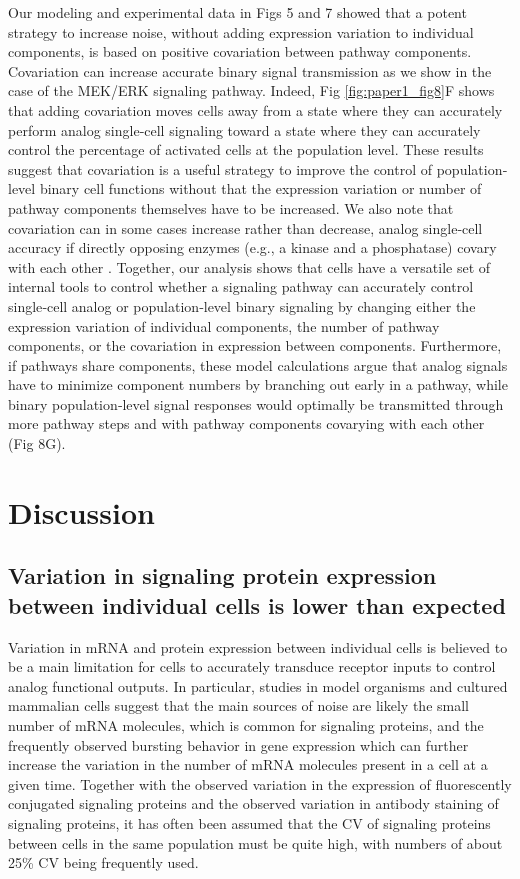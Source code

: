 Our modeling and experimental data in Figs 5 and 7 showed that a potent strategy to increase noise, without adding expression variation to individual components, is based on positive covariation between pathway components. Covariation can increase accurate binary signal transmission as we show in the case of the MEK/ERK signaling pathway. Indeed, Fig \ref{fig:paper1_fig8}F shows that adding covariation moves cells away from a state where they can accurately perform analog single‐cell signaling toward a state where they can accurately control the percentage of activated cells at the population level. These results suggest that covariation is a useful strategy to improve the control of population‐level binary cell functions without that the expression variation or number of pathway components themselves have to be increased. We also note that covariation can in some cases increase rather than decrease, analog single‐cell accuracy if directly opposing enzymes (e.g., a kinase and a phosphatase) covary with each other \cite{Feinerman2008}. Together, our analysis shows that cells have a versatile set of internal tools to control whether a signaling pathway can accurately control single‐cell analog or population‐level binary signaling by changing either the expression variation of individual components, the number of pathway components, or the covariation in expression between components. Furthermore, if pathways share components, these model calculations argue that analog signals have to minimize component numbers by branching out early in a pathway, while binary population‐level signal responses would optimally be transmitted through more pathway steps and with pathway components covarying with each other (Fig 8G).

\section{Discussion}

\subsection{Variation in signaling protein expression between individual cells is lower than expected}

Variation in mRNA and protein expression between individual cells is believed to be a main limitation for cells to accurately transduce receptor inputs to control analog functional outputs. In particular, studies in model organisms and cultured mammalian cells suggest that the main sources of noise are likely the small number of mRNA molecules, which is common for signaling proteins, and the frequently observed bursting behavior in gene expression which can further increase the variation in the number of mRNA molecules present in a cell at a given time. Together with the observed variation in the expression of fluorescently conjugated signaling proteins and the observed variation in antibody staining of signaling proteins, it has often been assumed that the CV of signaling proteins between cells in the same population must be quite high, with numbers of about 25\% CV being frequently used.

